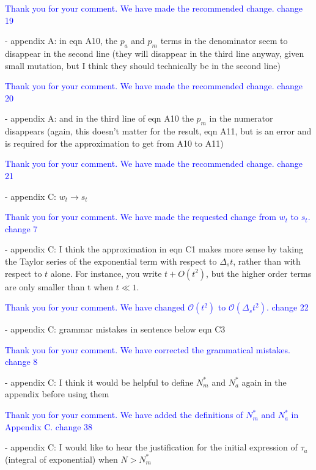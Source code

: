 \documentclass[11pt,a4paper]{article}
\begin{document}
\textcolor{blue}{Thank you for your comment. We have made the recommended change. change 19} 

- appendix A: in eqn A10, the $p_a$ and $p_m$ terms in the denominator seem to disappear in the second line (they will disappear in the third line anyway, given small mutation, but I think they should technically be in the second line)

\textcolor{blue}{Thank you for your comment. We have made the recommended change. change 20} 

- appendix A: and in the third line of eqn A10 the $p_m$ in the numerator disappears (again, this doesn't matter for the result, eqn A11, but is an error and is required for the approximation to get from A10 to A11)

\textcolor{blue}{Thank you for your comment. We have made the recommended change. change 21} 

- appendix C: $w_t\rightarrow s_t$

\textcolor{blue}{Thank you for your comment. We have made the requested change from $w_t$ to $s_t$. change 7} 

- appendix C: I think the approximation in eqn C1 makes more sense by taking the Taylor series of the exponential term with respect to $\Delta_st$, rather than with respect to $t$ alone. For instance, you write $t + O(t^2)$, but the higher order terms are only smaller than t when $t\ll1$.

\textcolor{blue}{Thank you for your comment. We have changed $\mathcal{O}\left(t^2\right)$ to $\mathcal{O}\left(\Delta_st^2\right)$. change 22} 

- appendix C: grammar mistakes in sentence below eqn C3

\textcolor{blue}{Thank you for your comment. We have corrected the grammatical mistakes. change 8} 

- appendix C: I think it would be helpful to define $N_m^*$ and $N_a^*$ again in the appendix before using them

\textcolor{blue}{Thank you for your comment. We have added the definitions of $N_m^*$ and $N_a^*$ in Appendix C. change 38} 

- appendix C: I would like to hear the justification for the initial expression of $\tau_a$ (integral of exponential) when $N>N_m^*$
\end{document}
